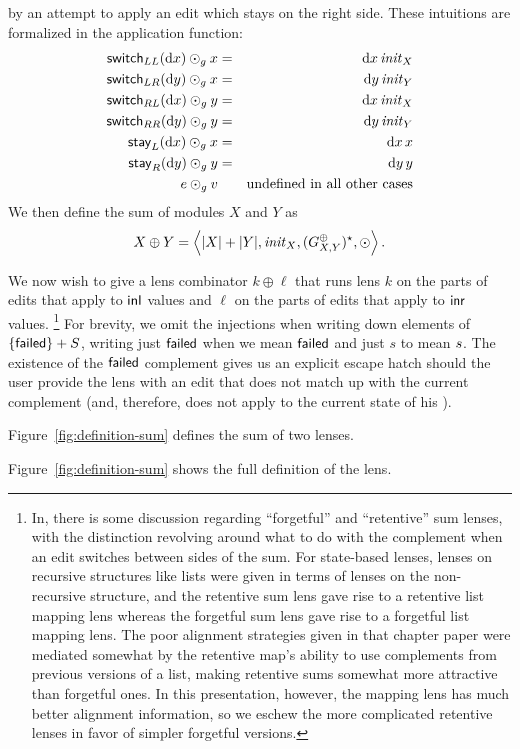 by an attempt to apply an edit which stays on the right
side. These intuitions are formalized in the application function:
\begin{eqnarray*}
    \mathsf{switch}_{LL}(\textrm{d} x)\odot_g x &=& {\textrm{d} x\,\mathit{init}_X} \\
    \mathsf{switch}_{LR}(\textrm{d} y)\odot_g x &=& {\textrm{d} y\,\mathit{init}_Y} \\
    \mathsf{switch}_{RL}(\textrm{d} x)\odot_g y &=& {\textrm{d} x\,\mathit{init}_X} \\
    \mathsf{switch}_{RR}(\textrm{d} y)\odot_g y &=& {\textrm{d} y\,\mathit{init}_Y} \\
    \mathsf{stay}_L(\textrm{d} x)\odot_g x &=& {\textrm{d} x\,x} \\
    \mathsf{stay}_R(\textrm{d} y)\odot_g y &=& {\textrm{d} y\,y} \\
    e \odot_g v && \mbox{undefined in all other cases}
\end{eqnarray*}
We then define the sum of modules $X$ and $Y$ as
\[X \oplus Y =
\left<|X|+|Y|,\mlinl{\init_X},(G^\oplus_{X,Y})\LIST,\odot\right>.\]

We now wish to give a lens combinator $k\oplus\ell$ that runs lens $k$ on
the parts of edits that apply to $\mathsf{inl}$ values and $\ell$ on
the parts of edits that apply to $\mathsf{inr}$ values.%
\footnote{\label{footnoteseven}%
In\symmlenses, there is some discussion regarding
``forgetful'' and ``retentive'' sum lenses, with the distinction revolving
around what to do with the complement when an edit switches between sides of
the sum. For state-based lenses, lenses on recursive structures like lists
were given in terms of lenses on the non-recursive structure, and the
retentive sum lens gave rise to a retentive list mapping lens whereas the
forgetful sum lens gave rise to a forgetful list mapping lens. The poor
alignment strategies given in that \ifdissertation chapter \else paper \fi
were mediated somewhat by the
retentive map's ability to use complements from previous versions of a list,
making retentive sums somewhat more attractive than forgetful ones. In this
presentation, however, the mapping lens has much better alignment
information, so we eschew the more complicated retentive lenses in favor of
simpler forgetful versions.
}
\iffailed
For brevity, we omit the injections when writing down elements of
$\{\mathsf{failed}\}+S$, writing just $\mathsf{failed}$ when we mean $\mathsf{failed}$
and just $s$ to mean $ s$. The existence of the $\mathsf{failed}$ complement
gives us an explicit escape hatch should the user provide the lens with an
edit that does not match up with the current complement (and, therefore,
does not apply to the current state of his \replica). 
\fi
\iffull
\begin{defn}[Sum]
Figure~\ref{fig:definition-sum} defines the sum of two lenses. 
\end{defn}
\else
Figure~\ref{fig:definition-sum} shows the full definition of the lens.
\fi%

